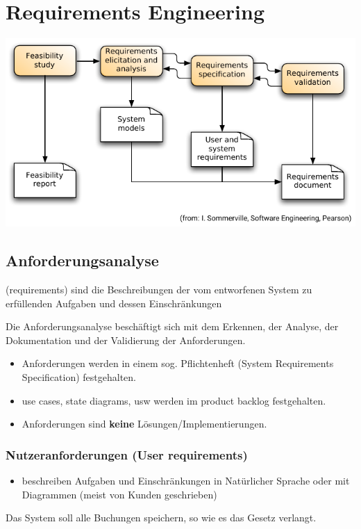 \documentclass[
    ngerman,
    color=3b,
    summary,
    boxarc,
    main,
]{rubos-tuda-template}
\begin{document}
\section{Requirements Engineering}
\includegraphics{bilder/Requirements engineering Process Flow.pdf}
{\centering
    \subsection{Anforderungsanalyse}
}
\begin{definition}[Anforderungen]
    (requirements) sind die Beschreibungen der vom entworfenen System zu erfüllenden Aufgaben und dessen Einschränkungen
\end{definition}
Die Anforderungsanalyse beschäftigt sich mit dem Erkennen, der Analyse, der Dokumentation und der Validierung der Anforderungen.
\begin{itemize}
    \item Anforderungen werden in einem sog. Pflichtenheft (System Requirements Specification) festgehalten.
    \item use cases, state diagrams, usw werden im product backlog festgehalten.
    \item Anforderungen sind \textbf{keine} Lösungen/Implementierungen.
\end{itemize}
\subsubsection{Nutzeranforderungen (User requirements)}
\begin{itemize}
    \item beschreiben Aufgaben und Einschränkungen in Natürlicher Sprache oder mit Diagrammen (meist von Kunden geschrieben)
\end{itemize}
 Das System soll alle Buchungen speichern, so wie es das Gesetz verlangt.
\end{document}
